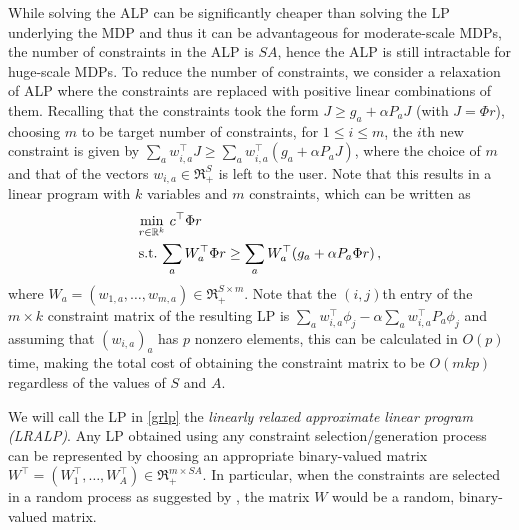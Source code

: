 \documentclass[twocolumn]{IEEEtran}
\begin{document}
While solving the ALP can be significantly cheaper than solving the LP underlying the MDP
and thus it can be advantageous for moderate-scale MDPs,
 the number of constraints in the ALP is $SA$,
hence the ALP is still intractable for huge-scale MDPs.
To reduce the number of constraints, we consider a relaxation of ALP
where the constraints are replaced with positive linear
combinations of them.
Recalling that the constraints took the form $J \ge g_a + \alpha P_a J$ (with $J = \Phi r$),
choosing $m$ to be target number of constraints, for $1\le i \le m$, the $i$th new constraint is given by
$\sum_a w_{i,a}^\top J \ge \sum_a w_{i,a}^\top(g_a + \alpha P_a J)$,
where the choice of $m$ and that of the vectors $w_{i,a}\in \Re_+^S$ is left to the user.
Note that this results in a linear program with $k$ variables and $m$ constraints, which can be written as
\begin{align}\label{grlp}
\begin{split}
&\underset{r\in \Re^k}{\min}\, \, c^\top \Phi r\\
&\text{s.t.}\mb  \,\sum_a W_a^\top \Phi r\geq \sum_a W_a^\top (g_a + \alpha P_a \Phi r)\,,
\end{split}
\end{align}
where $W_a = (w_{1,a},\dots,w_{m,a}) \in \Re_+^{S \times m}$.
Note that the $(i,j)$th entry of the $m\times k$ constraint matrix of the resulting LP is
$\sum_a  w_{i,a}^\top  \phi_j - \alpha \sum_a w_{i,a}^\top P_a \phi_j$ and assuming that $(w_{i,a})_{a}$ has $p$ nonzero
elements, this can be calculated in $O( p )$ time, making the total cost of obtaining the constraint matrix to be $O(mkp)$ regardless of the values of $S$ and $A$. 

We will call the LP in \eqref{grlp} the \emph{linearly relaxed approximate linear program (LRALP)}.
Any LP obtained using
any constraint selection/generation process can be represented by choosing an appropriate binary-valued matrix
$W^\top = (W_1^\top,\dots,W_A^\top)\in \Re_+^{m\times SA}$. In particular, when the constraints are selected
in a random process as suggested by \citet{CS}, the matrix $W$ would be a random, binary-valued matrix.
\end{document}
